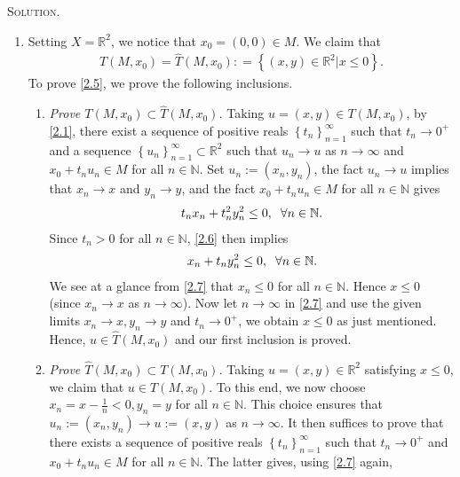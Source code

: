 \documentclass[a4paper]{article}
\numberwithin{equation}{section}
\begin{document}
\textsc{Solution.} 
\begin{enumerate}
\item Setting $X=\mathbb{R}^2$, we notice that $x_0=\left(0,0\right)\in M$. We claim that
\begin{align}
\label{2.5}
T\left( {M,{x_0}} \right) = \widehat T\left( {M,{x_0}} \right): = \left\{ {\left( {x,y} \right) \in {\mathbb{R}^2}|x \le 0} \right\}.
\end{align}
To prove \eqref{2.5}, we prove the following inclusions.
\begin{enumerate}
\item \textit{Prove $T\left( {M,{x_0}} \right) \subset \widehat T\left( {M,{x_0}} \right)$.} Taking $u=\left(x,y\right) \in T\left(M,x_0\right)$, by \eqref{2.1}, there exist a sequence of positive reals $\left\{ {{t_n}} \right\}_{n = 1}^\infty $ such that $t_n\to 0^+$ and a sequence $\left\{ {{u_n}} \right\}_{n = 1}^\infty  \subset {\mathbb{R}^2}$ such that $u_n\to u$ as $n\to \infty$ and $x_0+t_nu_n\in M$ for all $n\in \mathbb{N}$. Set $u_n:=\left(x_n,y_n\right)$, the fact $u_n\to u$ implies that $x_n\to x$ and $y_n\to y$, and the fact $x_0+t_n u_n\in M$ for all $n\in \mathbb{N}$ gives
\begin{align}
\label{2.6}
{t_n}{x_n} + t_n^2y_n^2 \le 0,\hspace{0.2cm}\forall n \in \mathbb{N}.
\end{align}
Since $t_n>0$ for all $n\in \mathbb{N}$, \eqref{2.6} then implies
\begin{align}
\label{2.7}
{x_n} + {t_n}y_n^2 \le 0,\hspace{0.2cm}\forall n \in \mathbb{N}.
\end{align}
We see at a glance from \eqref{2.7} that $x_n\le 0$ for all $n\in \mathbb{N}$. Hence $x\le 0$ (since $x_n\to x$ as $n\to \infty$). Now let $n\to \infty$ in \eqref{2.7} and use the given limits $x_n\to x,y_n\to y$ and $t_n\to 0^+$, we obtain $x\le 0$ as just mentioned. Hence, $u\in \widehat T \left(M,x_0\right)$ and our first inclusion is proved.
\item \textit{Prove $\widehat{T} \left( {M,{x_0}} \right) \subset T\left( {M,{x_0}} \right)$.} Taking $u=\left(x,y\right) \in \mathbb{R}^2$ satisfying $x\le 0$, we claim that $u\in T\left(M,x_0\right)$. To this end, we now choose $x_n=x-\frac{1}{n}<0, y_n=y$ for all $n\in \mathbb{N}$. This choice ensures that $u_n:=\left(
x_n,y_n\right) \to u:=\left(x,y\right)$ as $n\to \infty$. It then suffices to prove that there exists a sequence of positive reals $\left\{ {{t_n}} \right\}_{n = 1}^\infty $ such that $t_n\to 0^+$ and $x_0+t_nu_n\in M$ for all $n\in \mathbb{N}$. The latter gives, using \eqref{2.7} again, 

\end{enumerate}
\end{enumerate}
\end{document}
